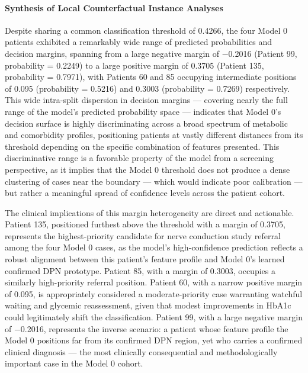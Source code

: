 \documentclass[pdflatex,sn-vancouver-num]{sn-jnl}
\begin{document}
\paragraph{Synthesis of Local Counterfactual Instance Analyses}

Despite sharing a common classification threshold of 0.4266, the four Model 0 patients exhibited a remarkably wide range of predicted probabilities and decision margins, spanning from a large negative margin of −0.2016 (Patient 99, probability = 0.2249) to a large positive margin of 0.3705 (Patient 135, probability = 0.7971), with Patients 60 and 85 occupying intermediate positions of 0.095 (probability = 0.5216) and 0.3003 (probability = 0.7269) respectively. This wide intra-split dispersion in decision margins — covering nearly the full range of the model's predicted probability space — indicates that Model 0's decision surface is highly discriminating across a broad spectrum of metabolic and comorbidity profiles, positioning patients at vastly different distances from its threshold depending on the specific combination of features presented. This discriminative range is a favorable property of the model from a screening perspective, as it implies that the Model 0 threshold does not produce a dense clustering of cases near the boundary — which would indicate poor calibration — but rather a meaningful spread of confidence levels across the patient cohort.

The clinical implications of this margin heterogeneity are direct and actionable. Patient 135, positioned furthest above the threshold with a margin of 0.3705, represents the highest-priority candidate for nerve conduction study referral among the four Model 0 cases, as the model's high-confidence prediction reflects a robust alignment between this patient's feature profile and Model 0's learned confirmed DPN prototype. Patient 85, with a margin of 0.3003, occupies a similarly high-priority referral position. Patient 60, with a narrow positive margin of 0.095, is appropriately considered a moderate-priority case warranting watchful waiting and glycemic reassessment, given that modest improvements in HbA1c could legitimately shift the classification. Patient 99, with a large negative margin of −0.2016, represents the inverse scenario: a patient whose feature profile the Model 0 positions far from its confirmed DPN region, yet who carries a confirmed clinical diagnosis — the most clinically consequential and methodologically important case in the Model 0 cohort.
\end{document}
